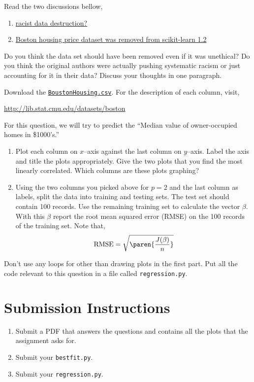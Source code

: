 \documentclass{homework}
\newcommand\csv{\href{%
    https://github.com/selva86/datasets/blob/master/BostonHousing.csv%
  }{\texttt{BoustonHousing.csv}}}
\begin{document}
\question Read the two discussions bellow,
\begin{enumerate}
  \item \href{https://tinyurl.com/y9w2e2gr}
        {racist data destruction?}
  \item \href{https://news.ycombinator.com/item?id=34189684}
        {Boston housing price dataset was removed from scikit-learn 1.2}
\end{enumerate}
Do you think the data set should have been removed even if it was
unethical? Do you think the original authors were actually pushing
systematic racism or just accounting for it in their data? Discuss
your thoughts in one paragraph.


\question Download the \csv. For the description of each column,
visit,

\url{http://lib.stat.cmu.edu/datasets/boston}

For this question, we will try to predict the ``Median value of
owner-occupied homes in \$1000's.''
\begin{enumerate}
  \item Plot each column on $x$--axis against the last column on
        $y$--axis. Label the axis and title the plots appropriately. Give
        the two plots that you find the most linearly correlated. Which
        columns are these plots graphing?

        
  \item Using the two columns you picked above for $p=2$ and the
        last column as labels, split the data into training and
        testing sets. The test set should contain 100 records. Use the
        remaining training set to calculate the vector $\beta$. With
        this $\beta$ report the root mean squared error (RMSE) on the
        100 records of the training set. Note that,
        \[
          \text{RMSE} = \sqrt{\paren{\frac{J(\beta)}{n}}}
        \]
\end{enumerate}
Don't use any loops for other than drawing plots in the first
part. Put all the code relevant to this question in a file called
\texttt{regression.py}.

\section*{Submission Instructions}

\begin{enumerate}
  \item Submit a PDF that answers the questions and contains all the
        plots that the assignment asks for.
  \item Submit your \texttt{bestfit.py}.
  \item Submit your \texttt{regression.py}.
\end{enumerate}
\end{document}
